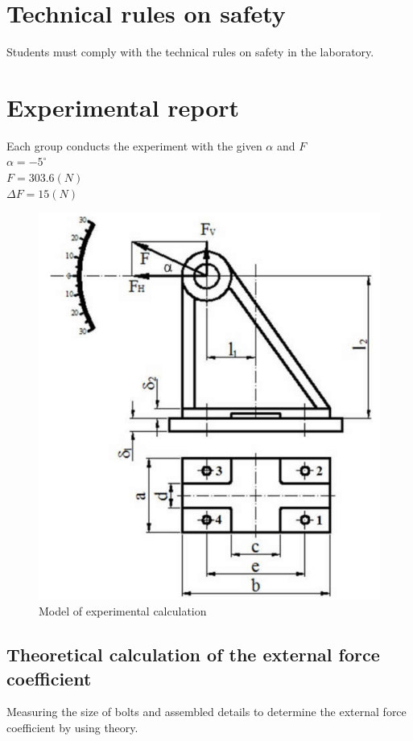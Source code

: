 \section{Technical rules on safety}
Students must comply with the technical rules on safety in the laboratory.

\section{Experimental report}
Each group conducts the experiment with the given $ \alpha $ and $ F $\\
$ \alpha = -5^\circ $\\
$ F = 303.6\unit{(N)} $\\
$ \Delta F = 15\unit{(N)} $
\begin{figure}[ht]
	\centering
	\includegraphics[width=120mm]{modelexp4.png}
	\caption{Model of experimental calculation}
	\label{exp4fig}
\end{figure}
\subsection{Theoretical calculation of the external force coefficient}
Measuring the size of bolts and assembled details to determine the external force
coefficient by using theory.
